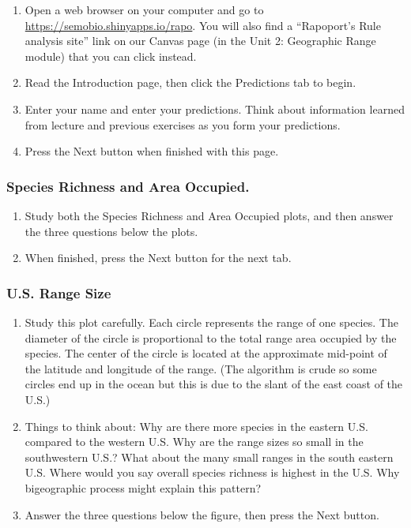 \documentclass[11pt]{article}
\begin{document}
\begin{enumerate}
	\item Open a web browser on your computer and go to \url{https://semobio.shinyapps.io/rapo}. 
	You will also find a “Rapoport's Rule analysis site” link on our Canvas page (in the Unit 2: Geographic Range module) that you can click instead.
	
	\item Read the Introduction page, then click the Predictions tab to begin. 
	
	\item Enter your name and enter your predictions. Think about information learned
	from lecture and previous exercises as you form your predictions.
	
	\item Press the Next button when finished with this page.
	
\end{enumerate}

\subsubsection*{Species Richness and Area Occupied.}

\begin{enumerate}[resume]
	\item Study both the Species Richness and Area Occupied plots, and then answer the three questions below the plots.
	
	\item When finished, press the Next button for the next tab.
		
\end{enumerate}

\subsubsection*{U.S. Range Size}


\begin{enumerate}[resume]
	
	\item Study this plot carefully. Each circle represents the range of one species.
	The diameter of the circle is proportional to the total range area occupied by the species.
	The center of the circle is located at the approximate mid-point of the latitude and 
	longitude of the range. (The algorithm is crude so some circles end up in the ocean but
	this is due to the slant of the east coast of the U.S.)
	
	\item Things to think about: Why are there more species in the eastern U.S. compared
	to the western U.S. Why are the range sizes so small in the southwestern U.S.? What
	about the many small ranges in the south eastern U.S. Where would you say overall
	species richness is highest in the U.S. Why bigeographic process might explain this pattern?
	
	\item Answer the three questions below the figure, then press the Next button.

\end{enumerate}
\end{document}
